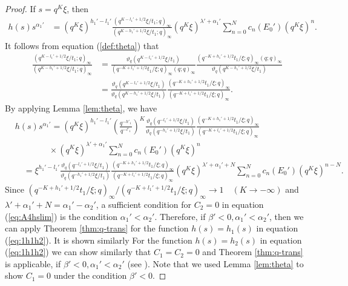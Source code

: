 \documentclass[12pt]{amsart}
\numberwithin{equation}{section}
\theoremstyle{definition}
\theoremstyle{remark}
\begin{document}
\begin{proof}
If $s= q^{K}\xi$, then
  \begin{align*}
    h(s) s^{\alpha_{1}'} 
    &= (q^{K}\xi)^{h_{1}' - l_{1}'} \frac{(q^{K - l_{1}' + 1/2}\xi/t_{1}; q)_\infty}{(q^{K - h_{1}' + 1/2}\xi/t_{1}; q)_\infty} (q^{K}\xi)^{\lambda ' + \alpha_{1}'} \sum_{n = 0}^{N} c_{n} (E_{0}')  (q^{K}\xi)^{n} .
  \end{align*}
It follows from equation (\ref{def:theta}) that
 \begin{align*}
    \frac{(q^{K - l_{1}' + 1/2}\xi/t_{1}; q)_\infty}{(q^{K - h_{1}' + 1/2}\xi/t_{1}; q)_\infty} &= \frac{\vartheta_{q} (q^{K - l_{1}' + 1/2}\xi/t_{1})}{(q^{- K + l_{1}' + 1/2}t_{1}/\xi; q)_{\infty} (q; q)_{\infty}} \frac{(q^{- K + h_{1}' + 1/2}t_{1}/\xi; q)_{\infty} (q; q)_{\infty}}{\vartheta_{q} (q^{K - h_{1}' + 1/2}\xi/t_{1})} \\
    &=\frac{\vartheta_{q} (q^{K - l_{1}' + 1/2}\xi/t_{1})}{\vartheta_{q} (q^{K - h_{1}' + 1/2}\xi/t_{1})} \frac{(q^{- K + h_{1}' + 1/2}t_{1}/\xi; q)_\infty}{(q^{- K + l_{1}' + 1/2}t_{1}/\xi; q)_\infty} .
  \end{align*}
By applying Lemma \ref{lem:theta}, we have
  \begin{align*}
 & h(s)s^{\alpha_{1}'} = (q^{K}\xi)^{h_{1}' - l_{1}'} \left(\frac{q^{- h'_{1}}}{q^{- l'_{1}}}\right)^{K} \frac{\vartheta_{q} (q^{- l_{1}' + 1/2}\xi/t_{1})}{\vartheta_{q} (q^{- h_{1}' + 1/2}\xi/t_{1})} \frac{(q^{- K + h_{1}' + 1/2}t_{1}/\xi; q)_\infty}{(q^{- K + l_{1}' + 1/2}t_{1}/\xi; q)_\infty} \\
    &\qquad \qquad \times (q^{K}\xi)^{\lambda ' + \alpha_{1}'} \sum_{n = 0}^{N} c_{n} (E_{0}') (q^{K}\xi)^{n} \\
    & \quad = \xi^{h_{1}' - l_{1}'} \frac{\vartheta_{q} (q^{- l_{1}' + 1/2}\xi/t_{1})}{\vartheta_{q} (q^{- h_{1}' + 1/2}\xi/t_{1})} \frac{(q^{- K + h_{1}' + 1/2}t_{1}/\xi; q)_\infty}{(q^{- K + l_{1}' + 1/2}t_{1}/\xi; q)_\infty} 
    (q^{K}\xi)^{\lambda ' + \alpha_{1}' +N} \sum_{n = 0}^{N} c_{n} (E_{0}') (q^{K}\xi)^{n-N} .
  \end{align*}
Since $(q^{- K + h_{1}' + 1/2}t_{1}/\xi; q)_\infty / (q^{- K + l_{1}' + 1/2}t_{1}/\xi; q)_\infty \to 1 \quad (K \to - \infty) $ and $\lambda ' + \alpha_{1}' +N = \alpha_{1}' - \alpha_{2}'  $, a sufficient condition for $C_2 =0$ in equation (\ref{eq:A4hslim}) is the condition $\alpha_{1}' < \alpha_{2}' $.
Therefore, if $\beta' < 0, \alpha_{1}' < \alpha_{2}'$, then we can apply Theorem \ref{thm:q-trans} for the function $h(s) = h_1(s)$ in equation (\ref{eq:1h1h2}).
It is shown similarly 
For the function $h(s) = h_2(s)$ in equation (\ref{eq:1h1h2}) we can show similarly that $C_1=C_2=0$ and Theorem \ref{thm:q-trans} is applicable, if $\beta' < 0, \alpha_{1}' < \alpha_{2}'$ (see \cite{Mm}).
Note that we used Lemma \ref{lem:theta} to show $C_1 =0$ under the condition $\beta' < 0 $.


\end{proof}
\end{document}
